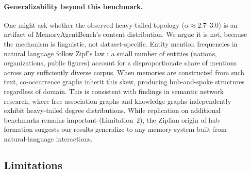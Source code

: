 \documentclass[11pt]{article}
\begin{document}
\paragraph{Generalizability beyond this benchmark.}
One might ask whether the observed heavy-tailed topology ($\alpha \approx 2.7$--$3.0$) is an artifact of MemoryAgentBench's content distribution.
We argue it is not, because the mechanism is linguistic, not dataset-specific.
Entity mention frequencies in natural language follow Zipf's law \citep{zipf_1949}: a small number of entities (nations, organizations, public figures) account for a disproportionate share of mentions across any sufficiently diverse corpus.
When memories are constructed from such text, co-occurrence graphs inherit this skew, producing hub-and-spoke structures regardless of domain.
This is consistent with findings in semantic network research, where free-association graphs \citep{steyvers_semantic_2005} and knowledge graphs \citep{barabasi_scalefree_1999} independently exhibit heavy-tailed degree distributions.
While replication on additional benchmarks remains important (Limitation~2), the Zipfian origin of hub formation suggests our results generalize to any memory system built from natural-language interactions.

\subsection{Limitations}
\end{document}
